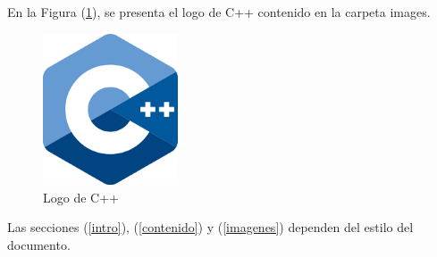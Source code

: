 \documentclass{article}
\begin{document}
En la Figura (\ref{fig:cpplogo}), se presenta el logo de C++ contenido en la carpeta images.

\begin{figure}[h]
\includegraphics[width=4cm]{cpplogo.png}
\centering
\caption{Logo de C++}
\label{fig:cpplogo}
\end{figure}

Las secciones (\ref{intro}), (\ref{contenido}) y (\ref{imagenes}) dependen del estilo del documento.



\end{document}
